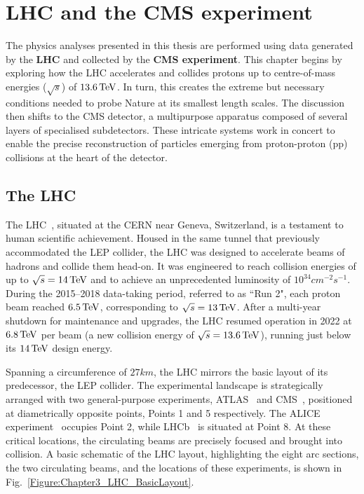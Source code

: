 \chapter{LHC and the CMS experiment}
\thispagestyle{plain}  %
\pagestyle{chapterpages}
\label{Section:Chapter3}

\minitoc

The physics analyses presented in this thesis are performed using data generated by the \textbf{LHC} and collected by the \textbf{\ac{CMS} experiment}. This chapter begins by exploring how the LHC accelerates and collides protons up to centre-of-mass energies ($\sqrt{s}$) of $13.6\,\text{Te\hspace{-.08em}V}$. In turn, this creates the extreme but necessary conditions needed to probe Nature at its smallest length scales. The discussion then shifts to the CMS detector, a multipurpose apparatus composed of several layers of specialised subdetectors. These intricate systems work in concert to enable the precise reconstruction of particles emerging from proton-proton (pp) collisions at the heart of the detector.

\section{The LHC}

The LHC~\cite{LHC_1}, situated at the \ac{CERN} near Geneva, Switzerland, is a testament to human scientific achievement. Housed in the same tunnel that previously accommodated the \ac{LEP} collider, the LHC was designed to accelerate beams of hadrons and collide them head-on. It was engineered to reach collision energies of up to $\sqrt{s} = 14\,\text{Te\hspace{-.08em}V}$ and to achieve an unprecedented luminosity of $10^{34}\unit{cm}^{-2}\unit{s}^{-1}$. During the 2015–2018 data-taking period, referred to as ``Run 2", each proton beam reached $6.5\,\text{Te\hspace{-.08em}V}$, corresponding to $\sqrt{s}=13\,\text{Te\hspace{-.08em}V}$. After a multi-year shutdown for maintenance and upgrades, the LHC resumed operation in 2022 at $6.8\,\text{Te\hspace{-.08em}V}$ per beam (a new collision energy of $\sqrt{s}=13.6\,\text{Te\hspace{-.08em}V}$), running just below its $14\,\text{Te\hspace{-.08em}V}$ design energy. 

Spanning a circumference of $27\unit{km}$, the LHC mirrors the basic layout of its predecessor, the LEP collider. The experimental landscape is strategically arranged with two general-purpose experiments, ATLAS~\cite{LHC_ATLAS} and CMS~\cite{LHC_CMS}, positioned at diametrically opposite points, Points 1 and 5 respectively. The ALICE experiment~\cite{LHC_ALICE} occupies Point 2, while LHCb~\cite{LHC_LCHb} is situated at Point 8. At these critical locations, the circulating beams are precisely focused and brought into collision. A basic schematic of the LHC layout, highlighting the eight arc sections, the two circulating beams, and the locations of these experiments, is shown in Fig.~\ref{Figure:Chapter3_LHC_BasicLayout}.

